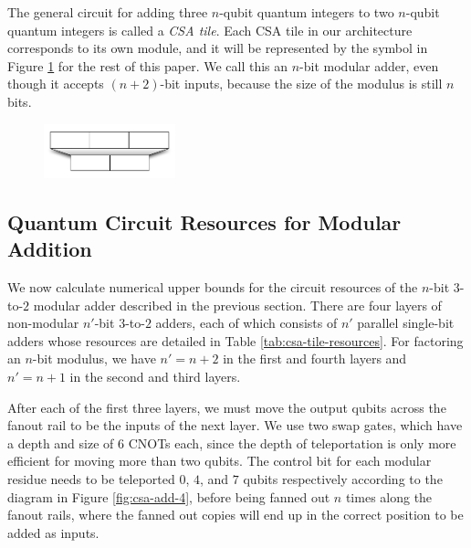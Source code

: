 \documentclass[twoside]{article}
\begin{document}
The general circuit for adding three $n$-qubit quantum integers to
two $n$-qubit quantum integers is called a \emph{CSA tile}. Each CSA tile in our architecture 
corresponds to its own module, and it will be represented by the symbol in 
Figure \ref{fig:csa-tile-symbol} for the rest of this paper. We call this
an $n$-bit modular adder, even though it accepts $(n+2)$-bit inputs, because
the size of the modulus is still $n$ bits.

\begin{center}
\begin{figure}[h!bt]
\centerline{
\includegraphics[width=1.5in]{./csa-tile-symbol.pdf}
}
\label{fig:csa-tile-symbol}
\end{figure}
\end{center}


\subsection{Quantum Circuit Resources for Modular Addition}

We now calculate numerical upper bounds for the circuit resources of
the $n$-bit $3$-to-$2$ modular adder described in the previous section.
There are four layers of non-modular $n'$-bit $3$-to-$2$ adders, each of which
consists of $n'$ parallel single-bit adders whose
resources are detailed in Table \ref{tab:csa-tile-resources}. For factoring
an $n$-bit modulus, we have $n'=n+2$ in the first and fourth layers
and $n'=n+1$ in the second and third layers.

After each of the first three layers, we must move the output qubits
across the fanout rail to be the inputs of the next layer. We use
two swap gates, which have a depth and size of $6$ CNOTs each, since
the depth of teleportation is only more efficient for moving more than
two qubits. The control bit for each modular residue needs to be
teleported $0$, $4$, and $7$ qubits respectively according to the
diagram in Figure \ref{fig:csa-add-4}, before being fanned out $n$
times along the fanout rails, where the fanned out copies will end up
in the correct position to be added as inputs.

\end{document}
